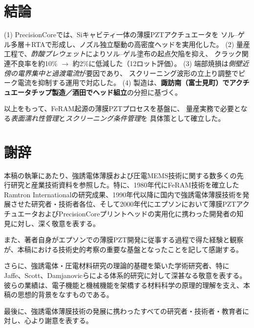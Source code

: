 \documentclass[conference]{IEEEtran}
\begin{document}
\section{結論}
(1) PrecisionCoreでは、Siキャビティ一体の薄膜PZTアクチュエータを
ソル–ゲル多層＋RTAで形成し、ノズル独立駆動の高密度ヘッドを実用化した\cite{uemura2014mems}。
(2) 量産工程で、\emph{酢酸プレウェット}によりソル–ゲル塗布の起点欠陥を抑え、
クラック関連不良率を約10\% $\rightarrow$ 約2\%に低減した（12ロット評価）。
(3) 端部焼損は\emph{側壁近傍の電界集中と過渡電流}が要因であり、
スクリーニング波形の立上り調整でピーク電流を抑制する運用で対応した。
(4) 製造は、\textbf{諏訪南（富士見町）でアクチュエータチップ製造／酒田でヘッド組立}の分担に基づく。

以上をもって、FeRAM起源の薄膜PZTプロセスを基盤に、
量産実務で必要となる\emph{表面濡れ性管理}と\emph{スクリーニング条件管理}を
具体策として確立した。

\section*{謝辞}
本稿の執筆にあたり、強誘電体薄膜および圧電MEMS技術に関する数多くの先行研究と産業技術資料を参照した。特に、1980年代にFeRAM技術を確立したRamtron Internationalの研究成果、1990年代以降に国内で強誘電体薄膜技術を発展させた研究者・技術者各位、そして2000年代にエプソンにおいて薄膜PZTアクチュエータおよびPrecisionCoreプリントヘッドの実用化に携わった開発者の知見に対し、深く敬意を表する。

また、著者自身がエプソンでの薄膜PZT開発に従事する過程で得た経験と観察が、本稿における技術史的考察の重要な基盤となったことを記して感謝する。

さらに、強誘電体・圧電材料研究の理論的基礎を築いた学術研究者、特にJaffe、Scott、Damjanovicらによる体系的研究に対して深甚なる敬意を表する。彼らの業績は、電子機能と機械機能を架橋する材料科学の原理的理解を支え、本稿の思想的背景をなすものである。

最後に、強誘電体薄膜技術の発展に携わったすべての研究者・技術者・教育者に対し、心より謝意を表する。
\end{document}
